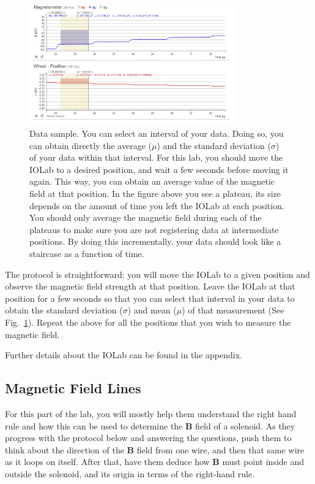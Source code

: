 \documentclass[12pt]{report}
\begin{document}
\begin{figure}[h]
\centering
\includegraphics[width=0.8\textwidth]{iolab-data-selection.PNG}
\caption{Data sample. You can select an interval of your data. Doing so, you can obtain directly the average ($\mu$) and the standard deviation ($\sigma$) of your data within that interval. For this lab, you should move the IOLab to a desired position, and wait a few seconds before moving it again. This way, you can obtain an average value of the magnetic field at that position. In the figure above you see a plateau, its size depends on the amount of time you left the IOLab at each position. You should only average the magnetic field during each of the plateaus to make sure you are not registering data at intermediate positions. By doing this incrementally, your data should look like a staircase as a function of time.}
\label{Fig:lab3-sessiona-iolab-interface2}
\end{figure}

The protocol is straightforward: you will move the IOLab to a given position and observe the magnetic field strength at that position. Leave the IOLab at that position for a few seconds so that you can select that interval in your data to obtain the standard deviation ($\sigma$) and mean ($\mu$) of that measurement (See Fig.~\ref{Fig:lab3-sessiona-iolab-interface2}). Repeat the above for all the positions that you wish to measure the magnetic field.

Further details about the IOLab can be found in the appendix.

\subsection{Magnetic Field Lines}
\begin{tcolorbox}
For this part of the lab, you will mostly help them understand the right hand rule and how this can be used to determine the $\mathbf{B}$ field of a solenoid. As they progress with the protocol below and answering the questions, push them to think about the direction of the $\mathbf{B}$ field from one wire, and then that same wire as it loops on  itself. After that, have them deduce how $\mathbf{B}$ must point inside and outside the solenoid, and its origin in terms of the right-hand rule.
\end{tcolorbox}
\end{document}
